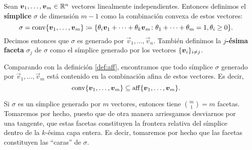 \begin{definition}
	\label{def:simplex}
	Sean $\boldsymbol{v}_1, \ldots, \boldsymbol{v}_m \in \mathbb{R}^n$ vectores linealmente
	independientes. Entonces definimos el \textbf{símplice} $\sigma$ de
	dimensión $m - 1$ como la combinación convexa de estos vectores:
	\begin{equation*}
		\sigma = \operatorname{conv}\lbrace \boldsymbol{v}_1, \ldots, \boldsymbol{v}_m \rbrace
		\coloneq
		\lbrace \theta_i\boldsymbol{v}_1 + \cdots + \theta_k\boldsymbol{v}_m
		\colon \theta_1 + \cdots + \theta_m = 1, \theta_i \geq 0 \rbrace.
	\end{equation*}
	Decimos entonces que $\sigma$ es generado por $\vec{v}_1, \ldots, \vec{v}_n$. También definimos
	la \textbf{$j$-ésima faceta} $\sigma_j$ de $\sigma$ como el símplice generado por los vectores
	$\lbrace \boldsymbol{v}_i \rbrace_{i \neq j}$.
\end{definition}
\begin{observation}
	Comparando con la definición \ref{def:aff}, encontramos que todo símplice $\sigma$ generado por
	$\vec{v}_1, \ldots, \vec{v}_m$ está contenido en la combinación afina de estos vectores. Es
	decir,
	\begin{equation}
		\label{aff:contention}
		\operatorname{conv}\lbrace \boldsymbol{v}_1, \ldots, \boldsymbol{v}_m \rbrace \subseteq
		\operatorname{aff}\lbrace \boldsymbol{v}_1, \ldots, \boldsymbol{v}_m \rbrace.
	\end{equation}
\end{observation}
\begin{observation}
	Si $\sigma$ es un símplice generado por $m$ vectores, entonces tiene
	$\binom{m}{1} = m$ facetas. Tomaremos por hecho, puesto que de otra
	manera arriesgamos desviarnos por una tangente, que estas facetas
	constituyen la frontera relativa del símplice dentro de la $k$-ésima capa
	entera. Es decir, tomaremos por hecho que las facetas constituyen las
	``caras'' de $\sigma$.
\end{observation}

